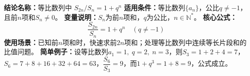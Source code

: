 \textbf{结论名称：}等比数列中 \(S_{2n}/S_n = 1+q^n\)
\textbf{适用条件：}等比数列\(\{a_n\}\)，公比\(q\neq -1\)，且前\(n\)项和\(S_n\neq0\)。
\textbf{变量说明：}\(S_n\)为前\(n\)项和，\(q\)为公比，\(n\in\mathbb{N}^*\)。
\textbf{核心公式：}
\[
\boxed{\frac{S_{2n}}{S_n}=1+q^n\quad(q\neq -1)}
\]
\textbf{使用场景：}已知前\(n\)项和时，快速求前\(2n\)项和；处理等比数列中连续等长片段和的比值问题。
\textbf{简单例子：}设等比数列\(a_1=1,\;q=2,\;n=3\)，则\(S_3=1+2+4=7\)，\(S_6=7+8+16+32+64=63\)，\(\dfrac{S_6}{S_3}=9\)，而\(1+q^3=1+8=9\)，公式成立。